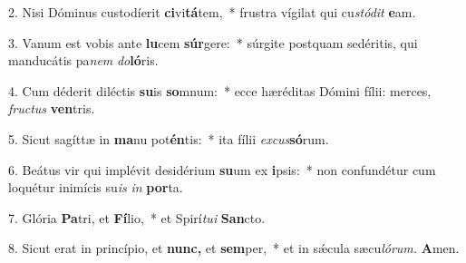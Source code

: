 \item 2. Nisi Dóminus custodíerit \textbf{ci}vi\textbf{tá}tem,~* frustra vígilat qui cu\tinyhspace\textit{stódit} \textbf{e}am.
\item 3. Vanum est vobis ante \textbf{lu}cem \textbf{súr}gere:~* súrgite postquam sedéritis, qui manducátis pa\tinyhspace\textit{nem} \textit{do}\textbf{ló}ris.
\item 4. Cum déderit diléctis \textbf{su}is \textbf{so}mnum:~* ecce hæréditas Dómini fílii: merces, \textit{fru\-ctus} \textbf{ven}tris.
\item 5. Sicut sagíttæ in \textbf{ma}nu pot\textbf{én}tis:~* ita fílii \textit{excus}\textbf{só}rum.
\item 6. Beátus vir qui implévit desidérium \textbf{su}um ex \textbf{i}psis:~* non confundétur cum loquétur inimícis su\tinyhspace\textit{is} \textit{in} \textbf{por}ta.
\item 7. Glória \textbf{Pa}tri, et \textbf{Fí}lio,~* et Spirí\tinyhspace\textit{tu}\textit{i} \textbf{San}cto.
\item 8. Sicut erat in princípio, et \textbf{nunc,} et \textbf{sem}per,~* et in sǽcula sæcu\tinyhspace\textit{lórum.} \textbf{A}men.
